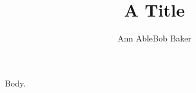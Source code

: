 \documentclass{article}
\title{A Title}
\author{Ann Able\footnotemark[2] \quad \footnotemark[2]Bob Baker}
\begin{document}
\maketitle {} Body.
\end{document}
